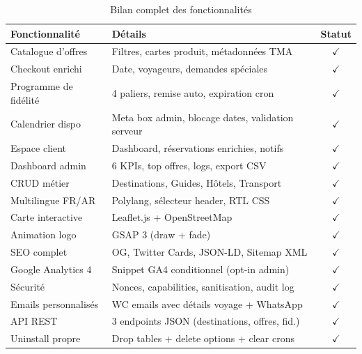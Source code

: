 \documentclass[12pt,a4paper]{report}
\begin{document}
\begin{table}[H]
\centering
\caption{Bilan complet des fonctionnalit\'es}
\begin{tabularx}{\textwidth}{lXc}
  \toprule
  \textbf{Fonctionnalit\'e} & \textbf{D\'etails} & \textbf{Statut} \\
  \midrule
  Catalogue d'offres        & Filtres, cartes produit, m\'etadonn\'ees TMA     & $\checkmark$ \\
  Checkout enrichi          & Date, voyageurs, demandes sp\'eciales           & $\checkmark$ \\
  Programme de fid\'elit\'e & 4 paliers, remise auto, expiration cron         & $\checkmark$ \\
  Calendrier dispo          & Meta box admin, blocage dates, validation serveur & $\checkmark$ \\
  Espace client             & Dashboard, r\'eservations enrichies, notifs     & $\checkmark$ \\
  Dashboard admin           & 6 KPIs, top offres, logs, export CSV            & $\checkmark$ \\
  CRUD m\'etier             & Destinations, Guides, H\^otels, Transport       & $\checkmark$ \\
  Multilingue FR/AR         & Polylang, sélecteur header, RTL CSS             & $\checkmark$ \\
  Carte interactive         & Leaflet.js + OpenStreetMap                      & $\checkmark$ \\
  Animation logo            & GSAP 3 (draw + fade)                           & $\checkmark$ \\
  SEO complet               & OG, Twitter Cards, JSON-LD, Sitemap XML        & $\checkmark$ \\
  Google Analytics 4        & Snippet GA4 conditionnel (opt-in admin)        & $\checkmark$ \\
  S\'ecurit\'e              & Nonces, capabilities, sanitisation, audit log  & $\checkmark$ \\
  Emails personnalis\'es    & WC emails avec d\'etails voyage + WhatsApp     & $\checkmark$ \\
  API REST                  & 3 endpoints JSON (destinations, offres, fid.) & $\checkmark$ \\
  Uninstall propre          & Drop tables + delete options + clear crons     & $\checkmark$ \\
  \bottomrule
\end{tabularx}
\end{table}
\end{document}
